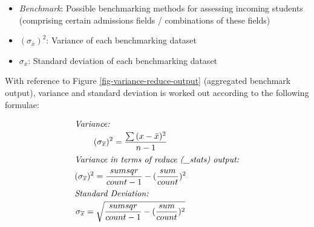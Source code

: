 \begin{itemize}
  \item \textit{Benchmark}: Possible benchmarking methods for assessing incoming students (comprising certain admissions fields / combinations of these fields)
  \item \textit{$(\sigma_{\overline{x}})^{2}$}: Variance of each benchmarking dataset
  \item \textit{$\sigma_{\overline{x}}$}: Standard deviation of each benchmarking dataset
\end{itemize}


With reference to Figure \ref{fig-variance-reduce-output} (aggregated benchmark output), variance and standard deviation is worked out according to the following formulae: \begin{spreadlines}{15pt}
  \begin{gather*}
    \intertext{\textit{Variance:}}
    (\sigma_{\overline{x}})^{2} = \frac{\sum{(x-\bar{x})^2}}{n-1}\\
    \intertext{\textit{Variance in terms of reduce (\_stats) output:}}
    (\sigma_{\overline{x}})^{2} = \frac{sumsqr}{count-1} - (\frac{sum}{count})^{2}\\
    \intertext{\textit{Standard Deviation:}}
    \sigma_{\overline{x}} = \sqrt{\frac{sumsqr}{count-1} - (\frac{sum}{count})^{2}}
  \end{gather*}
\end{spreadlines}


